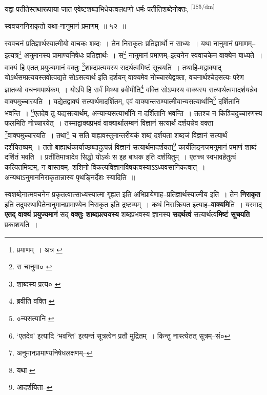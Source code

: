 \documentclass[article,12pt,a4paper]{memoir}
\begin{document}
	  \pstart यद्वा प्रतीतेस्तथारूपाया जात एवेष्टशब्दाभिधेयत्वलक्षणो धर्मः प्रतीतिशब्देनोक्तः,  \leavevmode\textsuperscript{\rmlatinfont\tiny [185/dm]} 
	  
	स्ववचननिराकृतो यथा-नानुमानं प्रमाणम् ॥ ५२ ॥ 
	  
	स्ववचनं प्रतिज्ञार्थस्यात्मीयो वाचकः शब्दः । तेन निराकृतः प्रतिज्ञार्थो न साध्यः । यथा नानुमानं प्रमाणम्--इत्यत्र\footnote{प्रमाणम् । अत्र \cite{dp-msA} \cite{dp-msB} \cite{dp-msD} \cite{dp-edP} \cite{dp-edH} \cite{dp-edE} \cite{dp-edN}} अनुमानस्य प्रामाण्यनिषेधः प्रतिज्ञार्थः । स\footnote{स चानुमा० \cite{dp-msC}} नानुमानं प्रमाणम्--इत्यनेन स्ववाचकेन वाक्येन बाध्यते । वाक्यं हि एतत् प्रयुज्यमानं वक्तुः \footnote{शाब्दस्य प्रत्य० \cite{dp-msA} \cite{dp-msB} \cite{dp-msC} \cite{dp-msD} \cite{dp-edP} \cite{dp-edH} \cite{dp-edE} \cite{dp-edN}}शाब्दप्रत्ययस्य सदर्थत्वमिष्टं सूचयति । तथाहि-मद्वाक्याद् योऽर्थसम्प्रत्ययस्तवोत्पद्यते सोऽसत्यार्थ इति दर्शयन् वाक्यमेव नोच्चारयेद्वक्ता, वचनार्थश्चेदसत्यः परेण ज्ञातव्यो वचनमपार्थकम् । योऽपि हि सर्वं मिथ्या ब्रवीमीति\footnote{ब्रवीति वक्ति \cite{dp-msB}} वक्ति सोऽप्यस्य वाक्यस्य सत्यार्थत्वमादर्शयन्नेव वाक्यमुच्चारयति । यद्येतद्वाक्यं सत्यार्थमादर्शितम्, एवं वाक्यान्तराण्यात्मीयान्यसत्यार्थानि\footnote{०न्यसत्यानि \cite{dp-msA}} दर्शितानि भवन्ति । \footnote{‘एतदेव’ इत्यादि ‘भवन्ति’ इत्यन्तं सूत्रत्वेन \cite{dp-edH} प्रतौ मुद्रितम् । किन्तु नास्त्येतत् सूत्रम्--सं०}एतदेव तु यद्यसत्यार्थम्, अन्यान्यसत्यार्भानि न दर्शितानि भवन्ति । ततश्च न किञ्चिदुच्चारणस्य फलमिति नोच्चारयेत् । तस्माद्वाक्यप्रभवं वाक्यार्थालम्बनं विज्ञानं सत्यार्थं दर्शयन्नेव वक्ता \footnote{अनुमानप्रामाण्यनिषेधलक्षणम्--\cite{dp-msD-n}}वाक्यमुच्चारयति । तथा\footnote{यथा \cite{dp-msA}} च सति बाह्यवस्तुनान्तरीयकं शब्दं दर्शयता शब्दजं विज्ञानं सत्यार्थं दर्शयितव्यम् । ततो बाह्यार्थकार्याच्छब्दादुत्पन्नं विज्ञानं सत्यार्थमादर्शयता\footnote{आदर्शयिता--\cite{dp-msA}} कार्यलिङ्गजमनुमानं प्रमाणं शाब्दं दर्शितं भवति । प्रतीतिमात्रादेव सिद्धो योऽर्थः स इह बाधक इति दर्शयितुम् । एतच्च स्वभावहेतुत्वं कल्पितमिष्टम्, न वास्तवम्, शशिनो विकल्पविज्ञानविषयत्वस्याऽऽध्यवसानिकत्वात् । अन्यथाऽनुमाननिराकृतान्नास्य पृथङ्निर्देशः स्यादिति ॥
	\pend
      

	  \pstart स्वशब्देनात्मवचनेन प्रकृतत्वात्साध्यस्यात्मा गृह्यत इति अभिप्रायेणाह--प्रतिज्ञार्थस्यात्मीय इति । तेन \textbf{निराकृत} इति तदुपस्थापितेनानुमानप्रामाण्येन निराकृत इति द्रष्टव्यम् । कथं निराक्रियत इत्याह--\textbf{वाक्यमि}ति । यस्माद् \textbf{एतद् वाक्यं प्रयुज्यमानं} सद् \textbf{वक्तुः शाब्दप्रत्ययस्य} शब्दप्रभवस्य ज्ञानस्य \textbf{सदर्थत्वं} सत्यार्थत्व\textbf{मिष्टं सूचयति} प्रकाशयति ।
	\pend
      
\end{document}
